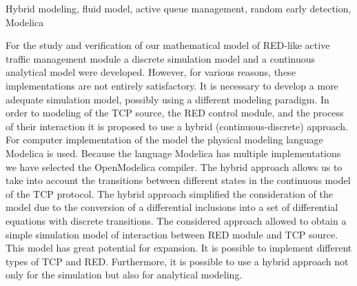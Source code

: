 Hybrid modeling, fluid model, active queue management, random early detection, Modelica


For the study and verification of our
mathematical model of RED-like active traffic management module a
discrete simulation model and a continuous analytical model were developed. However, for
various reasons, these implementations are not entirely satisfactory.
It is necessary to develop a more adequate
simulation model, possibly using a different modeling paradigm.
In order to modeling of the TCP source, the RED
control module, and the process of their interaction it is proposed to
use a hybrid (continuous-discrete) approach. For computer
implementation of the model the physical modeling language
Modelica is used. Because the language Modelica has multiple
implementations we have selected the OpenModelica compiler.
The hybrid approach allows us to take into account
the transitions between different states in the continuous model of
the TCP protocol. The hybrid approach simplified the consideration of the model due to the conversion of a
differential inclusions into a set of differential equations with
discrete transitions.
The considered approach allowed to obtain a
simple simulation model of interaction between RED module and TCP
source. This model has great potential for expansion. It is possible
to implement different types of TCP and RED. Furthermore, it is
possible to use a hybrid approach not only for the simulation but also
for analytical modeling.
